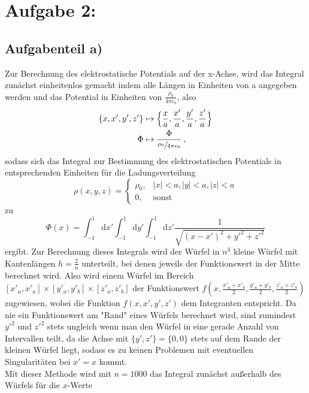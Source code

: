 \section*{Aufgabe 2: }

\subsection*{Aufgabenteil a)}
Zur Berechnung des elektrostatische Potentials auf der x-Achse, wird das Integral zunächst einheitenlos
gemacht indem alle Längen in Einheiten von a angegeben werden und das Potential in Einheiten
von $\frac{\rho_0}{4\pi\epsilon_0}$, also
\begin{align}
  \{x,x',y',z'\}&\mapsto \Big\{\frac{x}{a},\frac{x'}{a},\frac{y'}{a},\frac{z'}{a}\Big\} \\
  \Phi &\mapsto \frac{\Phi}{\sfrac{\rho_0}{4\pi\epsilon_0}} \: ,
\end{align}
sodass sich das Integral zur Bestimmung des elektrostatischen Potentials in entsprechenden Einheiten für die Ladungsverteilung
\begin{equation}
  \rho(x,y,z)=
  \begin{cases}
    \rho_0, & \lvert x \rvert < a, \lvert y \rvert < a, \lvert z \rvert < a \\
    0, & \text{sonst}
  \end{cases}
\end{equation}
zu
\begin{equation}
  \Phi(x)=\int_{-1}^{1}\text{d}x'\int_{-1}^{1}\text{d}y'\int_{-1}^{1}\text{d}z'\frac{1}{\sqrt{(x-x')^2+y'^2+z'^2}}
\end{equation}
ergibt.
Zur Berechnung dieses Integrals wird der Würfel in $n^3$ kleine Würfel mit Kantenlängen
$h=\frac{2}{n}$ unterteilt, bei denen jeweils der Funktionswert in der Mitte berechnet wird. Also wird einem Würfel im Bereich $[x'_a,x'_a]\times[y'_a,y'_b] \times[z'_a,z'_b]$ der Funktionswert $f\left(x,\frac{x'_a+x'_b}{2},\frac{y'_a+y'_b}{2},\frac{z'_a+z'_b}{2}\right)$ zugewiesen, wobei die Funktion $f(x,x',y',z')$
dem Integranten entspricht. Da nie ein Funktionswert am "Rand" eines Würfels berechnet wird, sind zumindest
$y'^2$ und $z'^2$ stets ungleich wenn man den Würfel in eine gerade Anzahl von Intervallen teilt, da die Achse mit $\{y',z'\}=\{0,0\}$ stets auf dem Rande der kleinen Würfel liegt, sodass es zu keinen Problemen mit eventuellen Singularitäten bei $x'=x$ kommt. \\
Mit dieser Methode wird mit $n=1000$ das Integral zunächst außerhalb des Würfels für die $x$-Werte
